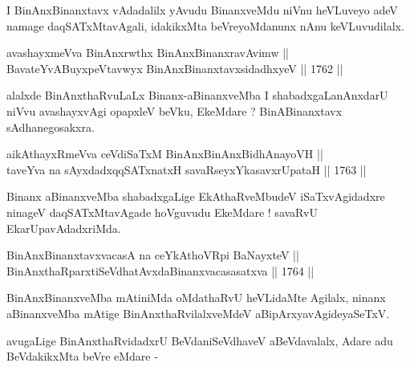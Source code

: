 \begin{artha}
I BinAnxBinanxtavx vAdadalilx yAvudu BinanxveMdu niVnu heVLuveyo adeV
namage daqSATxMtavAgali, idakikxMta beVreyoMdanunx nAnu keVLuvudilalx.
\end{artha}


\begin{shl}
avashayxmeVva BinAnxrwthx BinAnxBinanxravAvimw || \\
BavateYvABuyxpeVtavwyx BinAnxBinanxtavxsidadhxyeV ||  1762 ||  
\end{shl}	

\begin{artha}
alalxde BinAnxthaRvuLaLx Binanx-aBinanxveMba I shabadxgaLanAnxdarU niVvu
avashayxvAgi opapxleV beVku, EkeMdare ? BinABinanxtavx sAdhanegosakxra.
\end{artha}


\begin{shl}
aikAthayxRmeVva ceVdiSaTxM BinAnxBinAnxBidhAnayoVH ||  \\
taveYva na sAyxdadxqqSATxnatxH savaRseyxYkasavxrUpataH ||  1763 ||  
\end{shl}

\begin{artha}
Binanx aBinanxveMba shabadxgaLige EkAthaRveMbudeV iSaTxvAgidadxre
ninageV daqSATxMtavAgade hoVguvudu EkeMdare ! savaRvU
EkarUpavAdadxriMda.
\end{artha}


\begin{shl}
BinAnxBinanxtavxvacasA na ceYkAthoVR\s pi BaNayxteV ||  \\
BinAnxthaRparxtiSeVdhatAvxdaBinanxvacasasatxva ||  1764 ||  
\end{shl}

\begin{artha}
BinAnxBinanxveMba mAtiniMda oMdathaRvU heVLidaMte Agilalx, ninanx
aBinanxveMba mAtige BinAnxthaRvilalxveMdeV aBipArxyavAgideyaSeTxV.
\end{artha}

\begin{artha}
avugaLige BinAnxthaRvidadxrU BeVdaniSeVdhaveV aBeVdavalalx, Adare adu
BeVdakikxMta beVre eMdare -
\end{artha}

